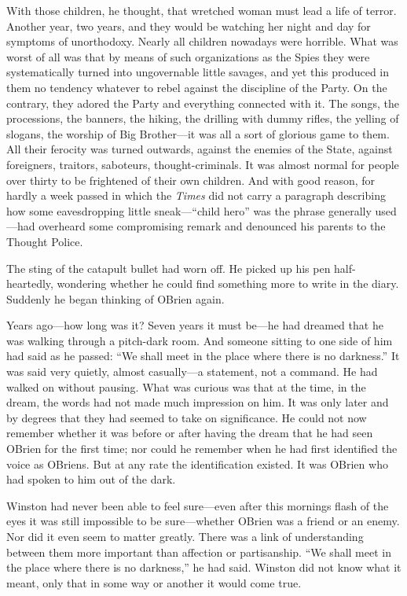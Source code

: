 With those children, he thought, that wretched woman must lead a life of
terror. Another year, two years, and they would be watching her night
and day for symptoms of unorthodoxy. Nearly all children nowadays were
horrible. What was worst of all was that by means of such organizations
as the Spies they were systematically turned into ungovernable little
savages, and yet this produced in them no tendency whatever to rebel
against the discipline of the Party. On the contrary, they adored the
Party and everything connected with it. The songs, the processions, the
banners, the hiking, the drilling with dummy rifles, the yelling of
slogans, the worship of Big Brother---it was all a sort of glorious game
to them. All their ferocity was turned outwards, against the enemies of
the State, against foreigners, traitors, saboteurs, thought-criminals.
It was almost normal for people over thirty to be frightened of their
own children. And with good reason, for hardly a week passed in which
the \emph{Times} did not carry a paragraph describing how some
eavesdropping little sneak---``child hero'' was the phrase generally
used---had overheard some compromising remark and denounced his parents
to the Thought Police.

The sting of the catapult bullet had worn off. He picked up his pen
half-heartedly, wondering whether he could find something more to write
in the diary. Suddenly he began thinking of O\textquotesingle Brien
again.

Years ago---how long was it? Seven years it must be---he had dreamed
that he was walking through a pitch-dark room. And someone sitting to
one side of him had said as he passed: ``We shall meet in the place where
there is no darkness.'' It was said very quietly, almost casually---a
statement, not a command. He had walked on without pausing. What was
curious was that at the time, in the dream, the words had not made much
impression on him. It was only later and by degrees that they had seemed
to take on significance. He could not now remember whether it was before
or after having the dream that he had seen O\textquotesingle Brien for
the first time; nor could he remember when he had first identified the
voice as O\textquotesingle Brien\textquotesingle s. But at any rate the
identification existed. It was O\textquotesingle Brien who had spoken to
him out of the dark.

Winston had never been able to feel sure---even after this
morning\textquotesingle s flash of the eyes it was still impossible to
be sure---whether O\textquotesingle Brien was a friend or an enemy. Nor
did it even seem to matter greatly. There was a link of understanding
between them more important than affection or partisanship. ``We shall
meet in the place where there is no darkness,'' he had said. Winston did
not know what it meant, only that in some way or another it would come
true.

